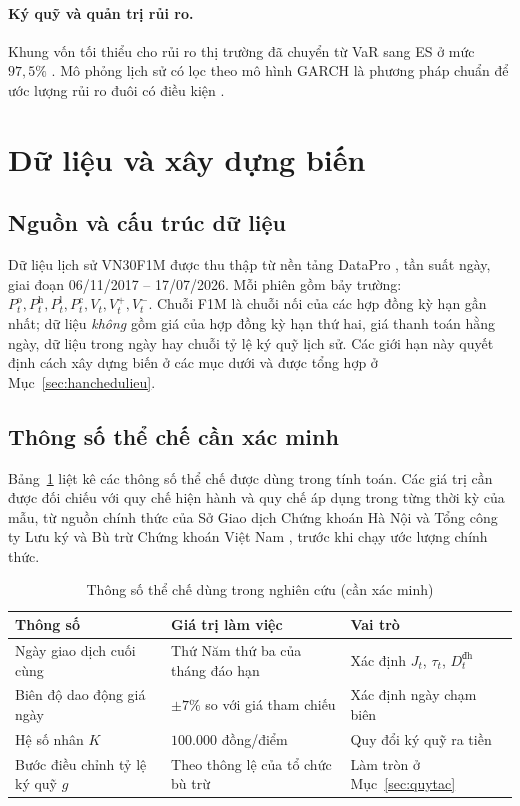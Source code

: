 \documentclass[12pt,a4paper]{article}
\theoremstyle{definition}
\theoremstyle{remark}
\begin{document}
\paragraph{Ký quỹ và quản trị rủi ro.} Khung vốn tối thiểu cho rủi ro thị trường đã chuyển từ VaR sang ES ở mức $97{,}5\%$ \cite{bcbs2019}. Mô phỏng lịch sử có lọc theo mô hình GARCH là phương pháp chuẩn để ước lượng rủi ro đuôi có điều kiện \cite{mcneilfrey2000}.

\section{Dữ liệu và xây dựng biến}\label{sec:dulieu}

\subsection{Nguồn và cấu trúc dữ liệu}

Dữ liệu lịch sử VN30F1M được thu thập từ nền tảng DataPro \cite{datapro}, tần suất ngày, giai đoạn 06/11/2017 -- 17/07/2026. Mỗi phiên gồm bảy trường: $P^{\mathrm o}_t, P^{\mathrm h}_t, P^{\mathrm l}_t, P^{\mathrm c}_t, V_t, V^{+}_t, V^{-}_t$. Chuỗi F1M là chuỗi nối của các hợp đồng kỳ hạn gần nhất; dữ liệu \emph{không} gồm giá của hợp đồng kỳ hạn thứ hai, giá thanh toán hằng ngày, dữ liệu trong ngày hay chuỗi tỷ lệ ký quỹ lịch sử. Các giới hạn này quyết định cách xây dựng biến ở các mục dưới và được tổng hợp ở Mục~\ref{sec:hanchedulieu}.

\subsection{Thông số thể chế cần xác minh}

Bảng~\ref{tab:thieche} liệt kê các thông số thể chế được dùng trong tính toán. Các giá trị cần được đối chiếu với quy chế hiện hành và quy chế áp dụng trong từng thời kỳ của mẫu, từ nguồn chính thức của Sở Giao dịch Chứng khoán Hà Nội \cite{hnx} và Tổng công ty Lưu ký và Bù trừ Chứng khoán Việt Nam \cite{vsdc}, trước khi chạy ước lượng chính thức.

\begin{table}[h]
\centering
\caption{Thông số thể chế dùng trong nghiên cứu (cần xác minh)}\label{tab:thieche}
\begin{tabular}{@{}lll@{}}
\toprule
\textbf{Thông số} & \textbf{Giá trị làm việc} & \textbf{Vai trò} \\
\midrule
Ngày giao dịch cuối cùng & Thứ Năm thứ ba của tháng đáo hạn & Xác định $J_t$, $\tau_t$, $D^{\text{đh}}_t$ \\
Biên độ dao động giá ngày & $\pm 7\%$ so với giá tham chiếu & Xác định ngày chạm biên \\
Hệ số nhân $K$ & $100.000$ đồng/điểm & Quy đổi ký quỹ ra tiền \\
Bước điều chỉnh tỷ lệ ký quỹ $g$ & Theo thông lệ của tổ chức bù trừ & Làm tròn ở Mục~\ref{sec:quytac} \\
\bottomrule
\end{tabular}
\end{table}
\end{document}
